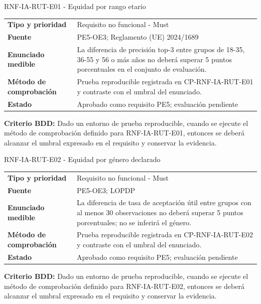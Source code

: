 \begin{reqbox}[colframe=Teal]{RNF-IA-RUT-E01 - Equidad por rango etario}
\begin{tabularx}{\textwidth}{>{\bfseries}p{3.2cm}Y}
Tipo y prioridad & Requisito no funcional - Must \\
Fuente & PE5-OE3; Reglamento (UE) 2024/1689 \\
Enunciado medible & La diferencia de precisión top-3 entre grupos de 18-35, 36-55 y 56 o más años no deberá superar 5 puntos porcentuales en el conjunto de evaluación. \\
Método de comprobación & Prueba reproducible registrada en CP-RNF-IA-RUT-E01 y contraste con el umbral del enunciado. \\
Estado & Aprobado como requisito PE5; evaluación pendiente \\
\end{tabularx}
\textbf{Criterio BDD:} Dado un entorno de prueba reproducible, cuando se ejecute el método de comprobación definido para RNF-IA-RUT-E01, entonces se deberá alcanzar el umbral expresado en el requisito y conservar la evidencia.
\end{reqbox}


\begin{reqbox}[colframe=Teal]{RNF-IA-RUT-E02 - Equidad por género declarado}
\begin{tabularx}{\textwidth}{>{\bfseries}p{3.2cm}Y}
Tipo y prioridad & Requisito no funcional - Must \\
Fuente & PE5-OE3; LOPDP \\
Enunciado medible & La diferencia de tasa de aceptación útil entre grupos con al menos 30 observaciones no deberá superar 5 puntos porcentuales; no se inferirá el género. \\
Método de comprobación & Prueba reproducible registrada en CP-RNF-IA-RUT-E02 y contraste con el umbral del enunciado. \\
Estado & Aprobado como requisito PE5; evaluación pendiente \\
\end{tabularx}
\textbf{Criterio BDD:} Dado un entorno de prueba reproducible, cuando se ejecute el método de comprobación definido para RNF-IA-RUT-E02, entonces se deberá alcanzar el umbral expresado en el requisito y conservar la evidencia.
\end{reqbox}


